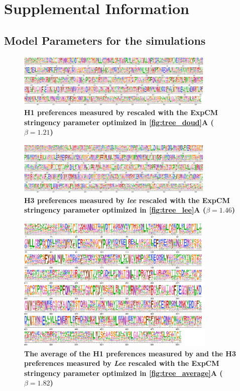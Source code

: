 \documentclass[11pt]{article}
\begin{document}
\newpage
\section*{Supplemental Information}

\subsection*{Model Parameters for the simulations}

\begin{figure}[H]
\centerline{\includegraphics[width=0.85\textwidth]{figures/prefs_doud}}
\caption{\label{fig:prefs_doud}
\textbf{H1 preferences measured by \cite{doud2016accurate} rescaled with the ExpCM stringency parameter optimized in \ref{fig:tree_doud}A  ($\beta = 1.21$)} 
}
\end{figure}

\begin{figure}[H]
\centerline{\includegraphics[width=0.85\textwidth]{figures/prefs_lee}}
\caption{\label{fig:prefs_lee}
\textbf{H3 preferences measured by \textit{lee} rescaled with the ExpCM stringency parameter optimized in \ref{fig:tree_lee}A  ($\beta = 1.46$)} 
}
\end{figure}

\begin{figure}[H]
\centerline{\includegraphics[width=0.85\textwidth]{figures/prefs_average}}
\caption{\label{fig:prefs_average}
\textbf{The average of the H1 preferences measured by \cite{doud2016accurate} and the H3 preferences measured by \textit{Lee} rescaled with the ExpCM stringency parameter optimized in \ref{fig:tree_average}A  ($\beta = 1.82$)}}
\end{figure}
\end{document}
